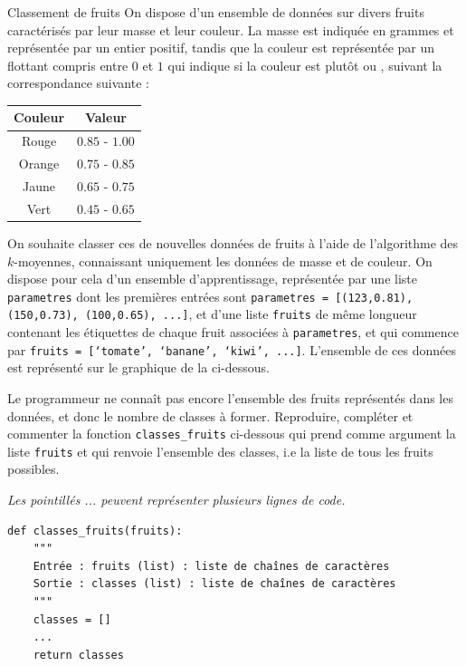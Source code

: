 \begin{exo}[PC][2][devoir]{Classement de fruits}
  On dispose d’un ensemble de données sur divers fruits caractérisés par leur masse et leur couleur. La masse est indiquée en grammes et représentée par un entier positif, tandis que la couleur est représentée par un flottant compris entre $0$ et $1$ qui indique si la couleur est plutôt  ou , suivant la correspondance suivante :
\begin{center}
\begin{tabular}{|c|c|}
  \hline
\textbf{Couleur} & \textbf{Valeur} \\
\hline
Rouge & $0.85$ - $1.00$ \\
Orange & $0.75$ - $0.85$ \\
Jaune & $0.65$ - $0.75$ \\
Vert & $0.45$ - $0.65$ \\
\hline
\end{tabular}
\end{center}
On souhaite classer ces de nouvelles données de fruits à l'aide de l'algorithme des $k$-moyennes, connaissant uniquement les données de masse et de couleur. On dispose pour cela d'un ensemble d'apprentissage, représentée par une liste \texttt{parametres} dont les premières entrées sont \texttt{parametres = [(123,0.81), (150,0.73), (100,0.65), ...]}, et d'une liste \texttt{fruits} de même longueur contenant les étiquettes de chaque fruit associées à \texttt{parametres}, et qui commence par \texttt{fruits = [`tomate', `banane', `kiwi', ...]}.  L'ensemble de ces données est représenté sur le graphique de la  ci-dessous. 

\begin{quest}
  \item	Le programmeur ne connaît pas encore l'ensemble des fruits représentés dans les données, et donc le nombre de classes à former. Reproduire, compléter et commenter la fonction \texttt{classes\_fruits} ci-dessous qui prend comme argument la liste \texttt{fruits} et qui renvoie l'ensemble des classes, i.e la liste de tous les fruits possibles. 
  
  \emph{Les pointillés ... peuvent représenter plusieurs lignes de code.}
  
\begin{verbatim}
def classes_fruits(fruits):
    """
    Entrée : fruits (list) : liste de chaînes de caractères
    Sortie : classes (list) : liste de chaînes de caractères
    """
    classes = []
    ...
    return classes
\end{verbatim}  




\end{quest}
\end{exo}
